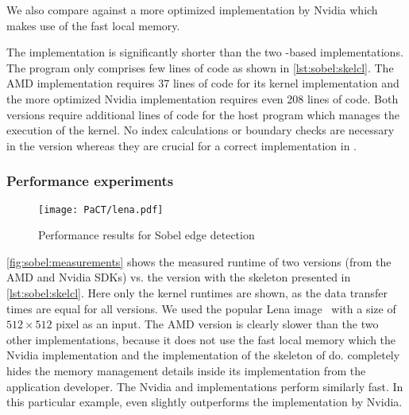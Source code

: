 We also compare against a more optimized \OpenCL implementation by Nvidia which makes use of the fast local \GPU memory.

The \SkelCL implementation is significantly shorter than the two \OpenCL-based implementations.
The \SkelCL program only comprises few lines of code as shown in \autoref{lst:sobel:skelcl}.
The AMD implementation requires 37 lines of code for its kernel implementation and the more optimized Nvidia implementation requires even 208 lines of code.
Both versions require additional lines of code for the host program which manages the execution of the \OpenCL kernel.
No index calculations or boundary checks are necessary in the \SkelCL version whereas they are crucial for a correct implementation in \OpenCL.

\subsubsection*{Performance experiments}

\begin{figure}[tbp]
  \vspace{.5em}
  \centering
  \texttt{[image: PaCT/lena.pdf]}
  \caption{Performance results for Sobel edge detection}
  \label{fig:sobel:measurements}
\end{figure}
\autoref{fig:sobel:measurements} shows the measured runtime of two \OpenCL versions (from the AMD and Nvidia SDKs) vs. the \SkelCL version with the \stencil skeleton presented in \autoref{lst:sobel:skelcl}.
Here only the kernel runtimes are shown, as the data transfer times are equal for all versions.
We used the popular Lena image~\cite{Lena} with a size of $512\times 512$ pixel as an input.
The AMD version is clearly slower than the two other implementations, because it does not use the fast local memory which the Nvidia implementation and the  implementation of the \stencil skeleton of \SkelCL do.
\SkelCL completely hides the memory management details inside its implementation from the application developer.
The Nvidia and \SkelCL implementations perform similarly fast.
In this particular example, \SkelCL even slightly outperforms the implementation by Nvidia.











